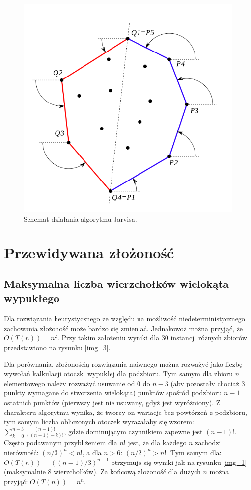 \documentclass[11pt,a4paper]{article}
\begin{document}
\begin{figure}
\includegraphics[width=\textwidth]{jarvis.png}
\caption{Schemat działania algorytmu Jarvisa.}
\label{img_jarvis}
\end{figure}

\section{Przewidywana złożoność}
\subsection{Maksymalna liczba wierzchołków wielokąta wypukłego}
Dla rozwiązania heurystycznego ze względu na możliwość niedeterministycznego zachowania złożoność może bardzo się zmieniać. Jednakowoż można przyjąć, że $O(T(n))=n^2$. Przy takim założeniu wyniki dla 30 instancji różnych zbiorów przedstawiono na rysunku \ref{img_3}.

Dla porównania, złożonością rozwiązania naiwnego można rozważyć jako liczbę wywołań kalkulacji otoczki wypukłej dla podzbioru. Tym samym dla zbioru $n$ elementowego należy rozważyć usuwanie od $0$ do $n-3$ (aby pozostały chociaż 3 punkty wymagane do stworzenia wielokąta) punktów spośród podzbioru $n-1$ ostatnich punktów (pierwszy jest nie usuwany, gdyż jest wyróżniony).
Z charakteru algorytmu wynika, że tworzy on wariacje bez powtórzeń z podzbioru, tym samym liczba obliczonych otoczek wyrażałaby się wzorem:
$\sum_{k=0}^{n-3} \frac{(n-1)!}{((n-1)-k)!}$, gdzie dominującym czynnikiem zapewne jest $(n-1)!$. Często podawanym przybliżeniem dla $n!$ jest, że dla każdego $n$ zachodzi nierówność: $(n/3)^n < n!$, a dla $n>6$: $(n/2)^n > n!$. Tym samym dla: $O(T(n))=((n-1)/3)^{n-1}$ otrzymuje się wyniki jak na rysunku \ref{img_1} (maksymalnie 8 wierzchołków). Za końcową złożoność dla dużych $n$ można przyjąć: $O(T(n))=n^n$.
\end{document}
